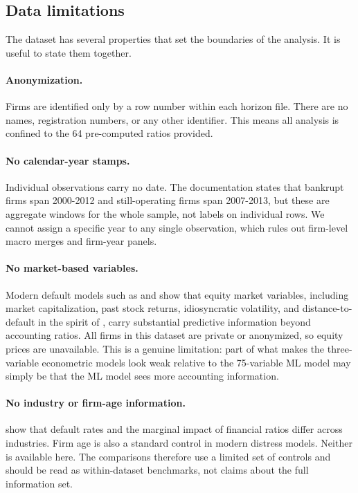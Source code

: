 \documentclass[12pt,a4paper]{article}
\begin{document}
\subsection{Data limitations}
\label{sec:data-limits}

The dataset has several properties that set the boundaries of the analysis.
It is useful to state them together.

\paragraph{Anonymization.} Firms are identified only by a row number within
each horizon file. There are no names, registration numbers, or any other
identifier. This means all analysis is confined to the 64 pre-computed ratios provided.

\paragraph{No calendar-year stamps.} Individual observations carry no date.
The documentation states that bankrupt firms span 2000-2012 and
still-operating firms span 2007-2013, but these are aggregate windows for
the whole sample, not labels on individual rows. We cannot assign a
specific year to any single observation, which rules out firm-level macro
merges and firm-year panels.

\paragraph{No market-based variables.} Modern default models such as
\cite{shumway2001} and \cite{campbell2008} show that equity market variables,
including market capitalization, past stock returns, idiosyncratic volatility,
and distance-to-default in the spirit of \cite{merton1974}, carry substantial
predictive information beyond accounting ratios. All firms in this dataset are
private or anonymized, so equity prices are unavailable. This is a genuine limitation: part of what makes the three-variable
econometric models look weak relative to the 75-variable ML model may simply
be that the ML model sees more accounting information.

\paragraph{No industry or firm-age information.} \cite{chava2004} show that
default rates and the marginal impact of financial ratios differ across
industries. Firm age is also a standard control in modern distress models.
Neither is available here. The comparisons therefore use a limited set of controls and should be read
as within-dataset benchmarks, not claims about the full information set.
\end{document}

